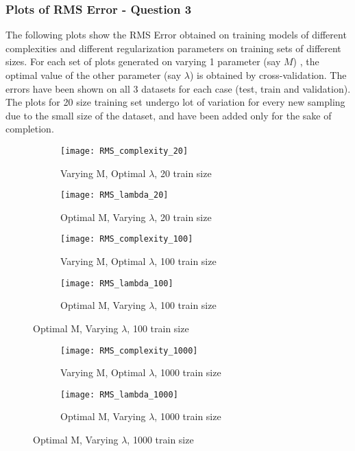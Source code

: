 \documentclass{article}
\begin{document}
\subsubsection{Plots of RMS Error - Question 3}
\begin{flushleft}
The following plots show the RMS Error obtained on training models of different complexities and different regularization parameters on training sets of different sizes. For each set of plots generated on varying 1 parameter (say $M$) , the optimal value of the other parameter (say $\lambda$) is obtained by cross-validation. 
The errors have been shown on all 3 datasets for each case (test, train and validation). The plots for 20 size training set undergo lot of variation for every new sampling due to the small size of the dataset, and have been added only for the sake of completion.
\end{flushleft}

\begin{figure}[H]

\begin{subfigure}{.5\textwidth}
\centering
\texttt{[image: RMS\_complexity\_20]}
\caption{Varying M, Optimal $\lambda$, 20 train size}
\end{subfigure}
\begin{subfigure}{.5\textwidth}
\texttt{[image: RMS\_lambda\_20]}
\caption{Optimal M, Varying $\lambda$, 20 train size}
\end{subfigure}


\begin{subfigure}{.5\textwidth}
\centering
\texttt{[image: RMS\_complexity\_100]}
\caption{Varying M, Optimal $\lambda$, 100 train size}
\end{subfigure}
\begin{subfigure}{.5\textwidth}
\texttt{[image: RMS\_lambda\_100]}
\caption{Optimal M, Varying $\lambda$, 100 train size}
\end{subfigure}
\end{figure}

\begin{figure}
\begin{subfigure}{.5\textwidth}
\centering
\texttt{[image: RMS\_complexity\_1000]}
\caption{Varying M, Optimal $\lambda$, 1000 train size}
\end{subfigure}
\begin{subfigure}{.5\textwidth}
\texttt{[image: RMS\_lambda\_1000]}
\caption{Optimal M, Varying $\lambda$, 1000 train size}
\end{subfigure}

\end{figure}
\end{document}
